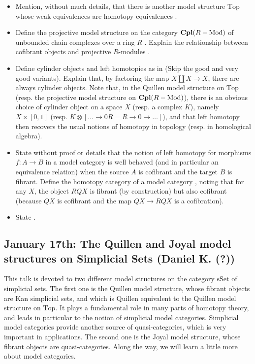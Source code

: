 \documentclass{amsart}
\theoremstyle{definition}
\theoremstyle{remark}
\newcommand{\ra}{\rightarrow}
\newcommand{\Cpl}{\mathop{\mathbf{Cpl}}\nolimits}
\newcommand{\Mod}{\rm Mod}
\newcommand{\Top}{\mathrm{Top}}
\newcommand{\sSet}{\mathrm{sSet}}
\begin{document}
\begin{itemize}
\item Mention, without much details, that there is another model structure $\mathrm{Top}$ whose weak equivalences are homotopy equivalences \cite[Def. 17.1.1]{May_Ponto}.
\item Define the projective model structure on the category $\Cpl(R-\Mod)$ of unbounded chain complexes over a ring $R$ \cite[Def. 18.4.1, Thm. 18.4.2, Thm. 18.4.3]{May_Ponto}. Explain the relationship between cofibrant objects and projective $R$-modules \cite[Prop. 18.5.2]{May_Ponto}.
\item Define cylinder objects and left homotopies as in \cite[Def. 14.3.1]{May_Ponto} (Skip the good and very good variants). Explain that, by factoring the map $X\coprod X\ra X$, there are always cylinder objects. Note that, in the Quillen model structure on $\Top$ (resp. the projective model structure on $\Cpl(R-\Mod)$), there is an obvious choice of cylinder object on a space $X$ (resp. a complex $K$), namely $X\times [0,1]$ (resp. $K\otimes [\ldots \ra 0 R= R\ra 0\ra\ldots]$), and that left homotopy then recovers the usual notions of homotopy in topology (resp. in homological algebra). 
\item State without proof or details that the notion of left homotopy for morphisms $f:A\ra B$ in a model category is well behaved (and in particular an equivalence relation) when the source $A$ is cofibrant and the target $B$ is fibrant. Define the homotopy category of a model category \cite[Def. 14.4.5]{May_Ponto}, noting that for any $X$, the object $RQX$ is fibrant (by construction) but also cofibrant (because $QX$ is cofibrant and the map $QX\ra RQX$ is a cofibration).
\item State \cite[Prop. 14.4.6, Thm. 14.4.7]{May_Ponto}. 
\end{itemize}

\subsection{January 17th: The Quillen and Joyal model structures on Simplicial Sets (Daniel K. (?))}

This talk is devoted to two different model structures on the category $\sSet$ of simplicial sets. The first one is the Quillen model structure, whose fibrant objects are Kan simplicial sets, and which is Quillen equivalent to the Quillen model structure on $\Top$. It plays a fundamental role in many parts of homotopy theory, and leads in particular to the notion of simplicial model categories. Simplicial model categories provide another source of quasi-categories, which is very important in applications. The second one is the Joyal model structure, whose fibrant objects are quasi-categories. Along the way, we will learn a little more about model categories.
\end{document}
